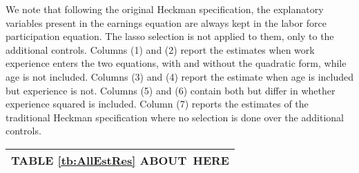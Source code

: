 \documentclass[11pt]{article}
\begin{document}
We note that following the original Heckman specification, the explanatory variables present in the
earnings equation are always %
kept in the labor force participation equation. %
The lasso selection is not applied to them, only to the additional controls. %
Columns (1) and (2) %
report the estimates %
when work experience %
enters the two equations, with and without the quadratic form, while age is not included. Columns (3) and (4) report the estimate when age is included but experience is not. Columns (5) and (6) contain both but differ in whether experience squared is included. Column (7) reports the estimates of the traditional Heckman specification where no selection is done over the additional controls.   

\begin{center}%
\begin{tabular}
[c]{l}\hline\hline
TABLE \ref{tb:AllEstRes} ABOUT\ HERE\\\hline\hline
\end{tabular}
\end{center}

\end{document}
